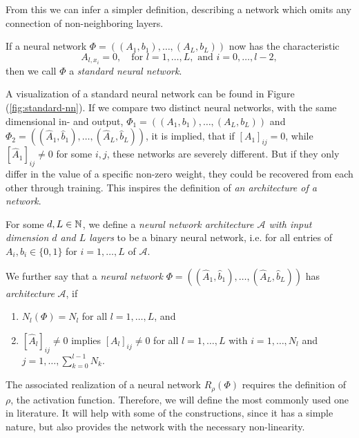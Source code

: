From this we can infer a simpler definition, describing a network which omits any connection of non-neighboring
layers.

\begin{definition} \label{def: standard neural network}
    If a neural network $\Phi = ((A_1, b_1), \dots, (A_L, b_L))$ now has the characteristic
    \begin{equation*}
        A_{l, x_i} = 0, \quad \mbox{for } l = 1, \dots, L, \mbox{ and } i = 0, \dots, l-2,
    \end{equation*}
    then we call $\Phi$ a \emph{standard neural network}.
\end{definition}
A visualization of a standard neural network can be found in Figure (\ref{fig:standard-nn}).
If we compare two distinct neural networks, with the same dimensional in- and output, $\Phi_1 = ((A_1, b_1), \dots, (A_L, b_L))$
and $\Phi_2 = ((\hat{A}_1, \hat{b}_1), \dots, (\hat{A}_L, \hat{b}_L))$, it is implied, 
that if $[A_1]_{ij}= 0$, while $[\hat{A}_1]_{ij} \neq 0$ for some $i, j$, these networks are
severely different. But if they only differ in the value of a specific non-zero weight, they could be recovered from each
other through training. This inspires the definition of \emph{an architecture of a network}.

\begin{definition} \label{def: neural network architecture}
    For some $d, L \in \mathbb{N}$, we define a \emph{neural network architecture $\mathcal{A}$ with input dimension $d$
    and $L$ layers} to be a binary neural network, i.e. for all entries of $A_i, b_i \in \{0, 1\}$ for $i = 1, \dots, L$ of $\mathcal{A}$.

    We further say that a \emph{neural network} $\Phi = ((\hat{A}_1, \hat{b}_1), \dots, (\hat{A}_L, \hat{b}_L))$ has \emph{architecture} $\mathcal{A}$, if
    \begin{enumerate}
        \item $N_l(\Phi) = N_l$ for all $l = 1, \dots, L$, and
        \item $[\hat{A}_l]_{ij} \neq 0$ implies $[A_l]_{ij} \neq 0$ for all $l = 1, \dots, L$ with $i = 1, \dots, N_l$ and
        $j = 1, \dots, \sum_{k=0}^{l-1} N_k$.
    \end{enumerate} 
\end{definition}

The associated realization of a neural network $R_\rho(\Phi)$ requires the definition of $\rho$, the activation function.
Therefore, we will
define the most commonly used one in literature. It will help with some of the constructions, since it has a simple nature, 
but also provides the network with the necessary non-linearity.

